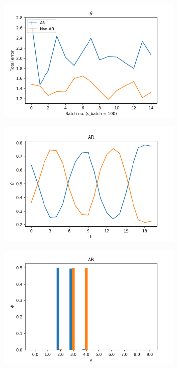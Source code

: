 \documentclass[12pt]{article}
\begin{document}
\begin{figure}[H]
  \centering
  \begin{subfigure}[b]{0.3\textwidth}
    \includegraphics[width=\linewidth]{performance_thetas_experiment-1|overlapping-yes_dataset-2.png}
  \end{subfigure}%
  \begin{subfigure}[b]{0.3\textwidth}
    \includegraphics[width=\linewidth]{latent_thetas_AR_experiment-1|overlapping-yes_dataset-2.png}
  \end{subfigure}%
  \begin{subfigure}[b]{0.3\textwidth}
    \includegraphics[width=\linewidth]{latent_phis_AR_experiment-1|overlapping-yes_dataset-2.png}
  \end{subfigure}%


\end{figure}
\end{document}
